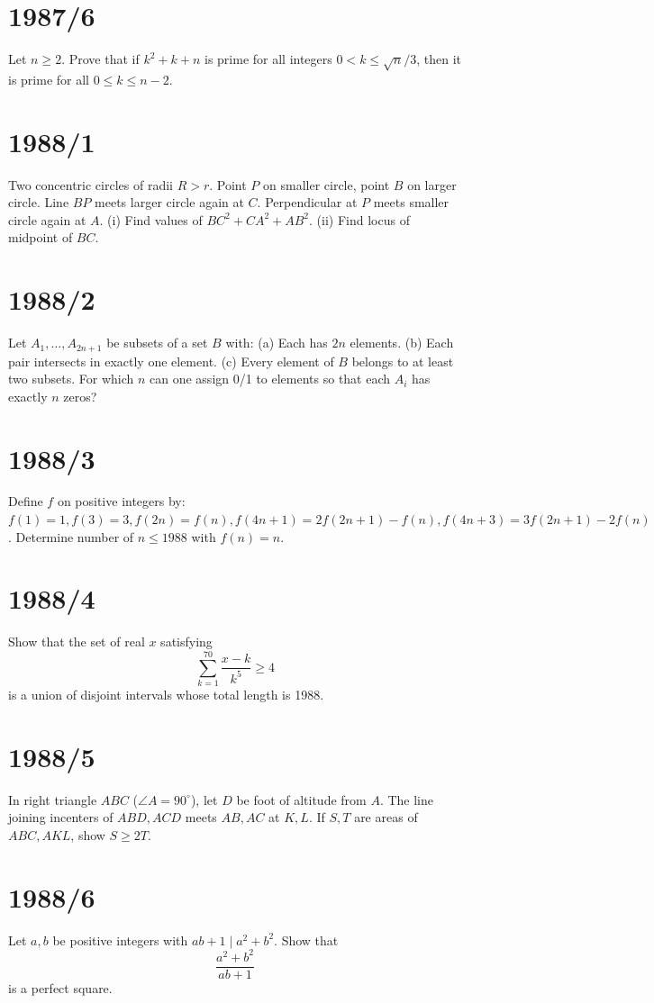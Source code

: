 \documentclass[12pt]{article}
\begin{document}
\section*{1987/6}
Let \(n \geq 2\). Prove that if \(k^2 + k + n\) is prime for all integers \(0 < k \leq \sqrt{n}/3\), then it is prime for all \(0 \leq k \leq n-2\).

\section*{1988/1}
Two concentric circles of radii \(R > r\). Point \(P\) on smaller circle, point \(B\) on larger circle. Line \(BP\) meets larger circle again at \(C\). Perpendicular at \(P\) meets smaller circle again at \(A\).  
(i) Find values of \(BC^2 + CA^2 + AB^2\).  
(ii) Find locus of midpoint of \(BC\).

\section*{1988/2}
Let \(A_1, \dots, A_{2n+1}\) be subsets of a set \(B\) with:  
(a) Each has \(2n\) elements.  
(b) Each pair intersects in exactly one element.  
(c) Every element of \(B\) belongs to at least two subsets.  
For which \(n\) can one assign 0/1 to elements so that each \(A_i\) has exactly \(n\) zeros?

\section*{1988/3}
Define \(f\) on positive integers by:  
\(f(1)=1, f(3)=3, f(2n)=f(n), f(4n+1)=2f(2n+1)-f(n), f(4n+3)=3f(2n+1)-2f(n)\).  
Determine number of \(n \leq 1988\) with \(f(n)=n\).

\section*{1988/4}
Show that the set of real \(x\) satisfying
\[
\sum_{k=1}^{70} \frac{x-k}{k^5} \geq 4
\]
is a union of disjoint intervals whose total length is 1988.

\section*{1988/5}
In right triangle \(ABC\) (\(\angle A = 90^\circ\)), let \(D\) be foot of altitude from \(A\). The line joining incenters of \(ABD, ACD\) meets \(AB, AC\) at \(K, L\). If \(S, T\) are areas of \(ABC, AKL\), show \(S \geq 2T\).

\section*{1988/6}
Let \(a, b\) be positive integers with \(ab+1 \mid a^2+b^2\). Show that
\[
\frac{a^2+b^2}{ab+1}
\]
is a perfect square.
\end{document}
